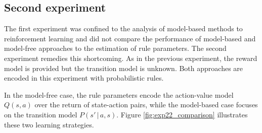 \subsection{Second experiment}
\label{rrlearning-exp22}

The first experiment was confined to the analysis of model-based methods to reinforcement learning and did not compare the performance of model-based and model-free approaches to the estimation of rule parameters.  The second experiment remedies this shortcoming. As in the previous experiment, the reward model is provided but the transition model is unknown.  Both approaches are encoded in this experiment with probabilistic rules.

In the model-free case, the rule parameters encode the action-value model $Q(s,a)$ over the return of state-action pairs, while the model-based case focuses on the transition model $P(s'\, | \, a,s)$.  Figure \ref{fig:exp22_comparison} illustrates these two learning strategies.  

